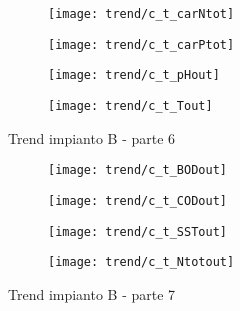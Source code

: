 \begin{sidewaysfigure}[h]\ContinuedFloat
	\renewcommand*\thesubfigure{(\arabic{subfigure})}
	\begin{subfigure}{0.49\textwidth}
		\texttt{[image: trend/c\_t\_carNtot]}
		\caption{}
		\centering
	\end{subfigure}
	\begin{subfigure}{0.49\textwidth}
		\texttt{[image: trend/c\_t\_carPtot]}
		\caption{}
		\centering
	\end{subfigure}

	\begin{subfigure}{0.49\textwidth}
		\texttt{[image: trend/c\_t\_pHout]}
		\caption{}
		\label{fig:c_t_pHout}
		\centering
	\end{subfigure}
	\begin{subfigure}{0.49\textwidth}
		\texttt{[image: trend/c\_t\_Tout]}	
		\caption{}
		\label{fig:c_t_Tout}
		\centering
	\end{subfigure}
	\caption{Trend impianto B - parte 6}
\end{sidewaysfigure}

\begin{sidewaysfigure}[h]\ContinuedFloat
	\renewcommand*\thesubfigure{(\arabic{subfigure})}
	\begin{subfigure}{0.49\textwidth}
		\texttt{[image: trend/c\_t\_BODout]}
		\caption{}
		\centering
	\end{subfigure}
	\begin{subfigure}{0.49\textwidth}
		\texttt{[image: trend/c\_t\_CODout]}
		\caption{}
		\centering
	\end{subfigure}

	\begin{subfigure}{0.49\textwidth}
		\texttt{[image: trend/c\_t\_SSTout]}
		\caption{}
		\centering
	\end{subfigure}
	\begin{subfigure}{0.49\textwidth}
		\texttt{[image: trend/c\_t\_Ntotout]}	
		\caption{}
		\centering
	\end{subfigure}
	\caption{Trend impianto B - parte 7}
\end{sidewaysfigure}

